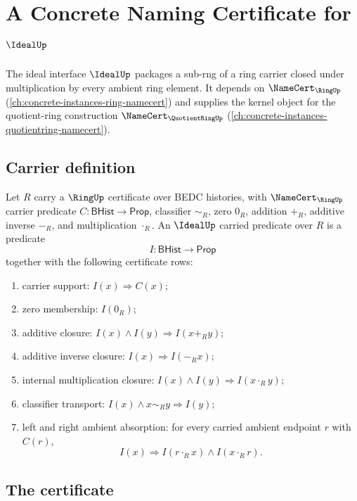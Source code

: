 \chapter{A Concrete Naming Certificate for $\IdealUp$}
\label{ch:concrete-instances-ideal-namecert}

The ideal interface $\IdealUp$ packages a sub-rng of a ring carrier closed under multiplication by every ambient ring element. It depends on $\NameCert_{\RingUp}$ (\autoref{ch:concrete-instances-ring-namecert}) and supplies the kernel object for the quotient-ring construction $\NameCert_{\QuotientRingUp}$ (\autoref{ch:concrete-instances-quotientring-namecert}).

\section{Carrier definition}
\label{sec:ideal-carrier}

\begin{definition}
\label{def:ideal-carried-predicate-rows}
Let $R$ carry a $\RingUp$ certificate over BEDC histories, with $\NameCert_{\RingUp}$ carrier predicate $C:\mathsf{BHist}\to\mathsf{Prop}$, classifier $\sim_R$, zero $0_R$, addition $+_R$, additive inverse $-_R$, and multiplication $\cdot_R$. An $\IdealUp$ carried predicate over $R$ is a predicate
$$
I:\mathsf{BHist}\to\mathsf{Prop}
$$
together with the following certificate rows:
\begin{enumerate}
\item carrier support: $I(x)\Longrightarrow C(x)$;
\item zero membership: $I(0_R)$;
\item additive closure: $I(x)\land I(y)\Longrightarrow I(x+_R y)$;
\item additive inverse closure: $I(x)\Longrightarrow I(-_R x)$;
\item internal multiplication closure: $I(x)\land I(y)\Longrightarrow I(x\cdot_R y)$;
\item classifier transport: $I(x)\land x\sim_R y\Longrightarrow I(y)$;
\item left and right ambient absorption: for every carried ambient endpoint $r$ with $C(r)$,
$$
I(x)\Longrightarrow I(r\cdot_R x)\land I(x\cdot_R r).
$$
\end{enumerate}
\end{definition}

\section{The certificate}
\label{sec:ideal-certificate}

